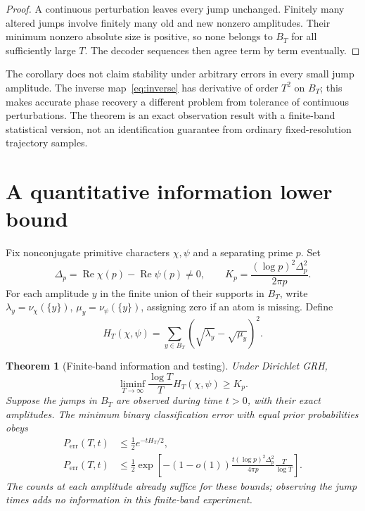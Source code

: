 \documentclass[11pt]{article}
\newtheorem{theorem}{Theorem}[section]
\theoremstyle{definition}
\newcommand{\Rea}{\operatorname{Re}}
\begin{document}
\begin{proof}
A continuous perturbation leaves every jump unchanged. Finitely many altered
jumps involve finitely many old and new nonzero amplitudes. Their minimum
nonzero absolute size is positive, so none belongs to $B_T$ for all sufficiently
large $T$. The decoder sequences then agree term by term eventually.
\end{proof}

The corollary does not claim stability under arbitrary errors in every small
jump amplitude. The inverse map~\eqref{eq:inverse} has derivative of order
$T^2$ on $B_T$; this makes accurate phase recovery a different problem from
tolerance of continuous perturbations. The theorem is an exact observation
result with a finite-band statistical version, not an identification guarantee
from ordinary fixed-resolution trajectory samples.

\section{A quantitative information lower bound}
\label{sec:info}

Fix nonconjugate primitive characters $\chi,\psi$ and a separating prime $p$.
Set
\begin{equation}\label{eq:K}
 \Delta_p=\Rea\chi(p)-\Rea\psi(p)\ne0,
 \qquad K_p=\frac{(\log p)^2\Delta_p^2}{2\pi p}.
\end{equation}
For each amplitude $y$ in the finite union of their supports in $B_T$, write
$\lambda_y=\nu_\chi(\{y\})$, $\mu_y=\nu_\psi(\{y\})$, assigning zero if an
atom is missing. Define
\begin{equation}\label{eq:hell}
 H_T(\chi,\psi)
   =\sum_{y\in B_T}(\sqrt{\lambda_y}-\sqrt{\mu_y})^2.
\end{equation}

\begin{theorem}[Finite-band information and testing]\label{thm:information}
Under Dirichlet GRH,
\begin{equation}\label{eq:information}
 \liminf_{T\to\infty}\frac{\log T}{T}H_T(\chi,\psi)\ge K_p.
\end{equation}
Suppose the jumps in $B_T$ are observed during time $t>0$, with their exact
amplitudes. The minimum binary classification error with equal prior
probabilities obeys
\begin{align}
 P_{\mathrm{err}}(T,t)&\le\tfrac12e^{-tH_T/2},\label{eq:err1}\\
 P_{\mathrm{err}}(T,t)&\le\tfrac12
 \exp\left[-(1-o(1))\frac{t(\log p)^2\Delta_p^2}{4\pi p}
                                   \frac T{\log T}\right].\label{eq:err2}
\end{align}
The counts at each amplitude already suffice for these bounds; observing the
jump times adds no information in this finite-band experiment.
\end{theorem}
\end{document}
